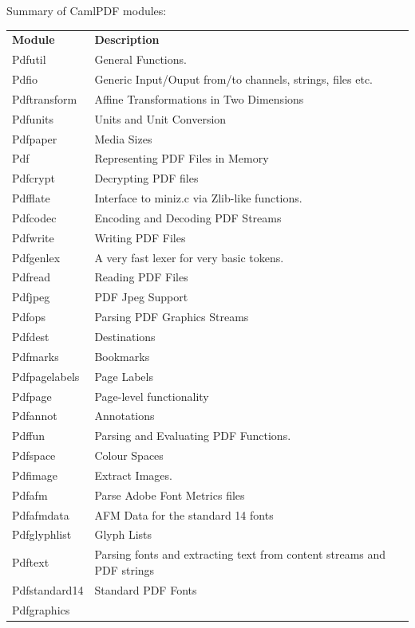 \documentclass[a4paper]{memoir}
\newcommand{\smallgap}{\vspace{4mm}}
\begin{document}
\smallgap

\noindent Summary of \textsf{CamlPDF} modules:

\smallgap

{\centering\small
\begin{tabular}{lp{10cm}l}
  \textbf{Module} & \textbf{Description} \\
Pdfutil &
General Functions. & \\
Pdfio &
Generic Input/Ouput from/to channels, strings, files etc. & \\
Pdftransform &
Affine Transformations in Two Dimensions &  \\
Pdfunits &
Units and Unit Conversion & \\
Pdfpaper &
Media Sizes & \\
Pdf &
Representing PDF Files in Memory & \\
Pdfcrypt &
Decrypting PDF files & \\
Pdfflate &
Interface to miniz.c via Zlib-like functions. & \\
Pdfcodec &
Encoding and Decoding PDF Streams & \\
Pdfwrite &
Writing PDF Files & \\
Pdfgenlex &
A very fast lexer for very basic tokens. & \\
Pdfread &
Reading PDF Files & \\
Pdfjpeg &
PDF Jpeg Support & \\
Pdfops &
Parsing PDF Graphics Streams & \\
Pdfdest &
Destinations & \\
Pdfmarks &
Bookmarks & \\
Pdfpagelabels &
Page Labels & \\
Pdfpage &
Page-level functionality & \\
Pdfannot &
Annotations & \\
Pdffun &
Parsing and Evaluating PDF Functions. & \\
Pdfspace &
Colour Spaces & \\
Pdfimage &
Extract Images. & \\
Pdfafm &
Parse Adobe Font Metrics files & \\
Pdfafmdata &
AFM Data for the standard 14 fonts & \\ 
Pdfglyphlist &
Glyph Lists & \\
Pdftext &
Parsing fonts and extracting text from content streams and PDF strings & \\
Pdfstandard14 &
Standard PDF Fonts & \\
Pdfgraphics &

\end{tabular}}
\end{document}
